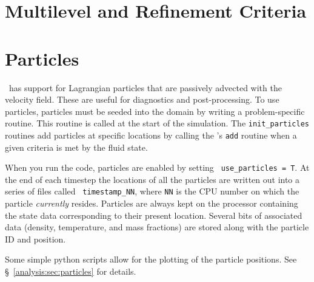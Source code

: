 \section{Multilevel and Refinement Criteria}


\section{Particles}

\label{arch:sec:particles}

\maestro\ has support for Lagrangian particles that are passively
advected with the velocity field.  These are useful for diagnostics
and post-processing.  To use particles, particles must be seeded into
the domain by writing a problem-specific 
routine.  This routine is called at the start of the simulation.  The
{\tt init\_particles} routines add particles at specific locations by
calling the 's {\tt add} routine when a given
criteria is met by the fluid state.

When you run the code, particles are enabled by setting {\tt
  use\_particles = T}.  At the end of each timestep the locations of
all the particles are written out into a series of files called {\tt
  timestamp\_NN}, where {\tt NN} is the CPU number on which the
particle {\em currently} resides.  Particles are always kept on the
processor containing the state data corresponding to their present
location.  Several bits of associated data (density, temperature, and
mass fractions) are stored along with the particle ID and position.

Some simple python scripts allow for the plotting of the particle
positions.  See \S~\ref{analysis:sec:particles} for details.


